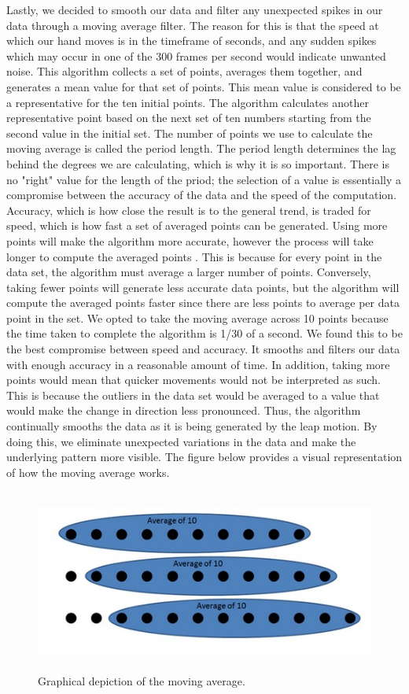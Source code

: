 \documentclass[letterpaper,english, 12pt]{article}
\begin{document}
Lastly, we decided to smooth our data and filter any unexpected spikes in our data through a moving average filter.  The reason for this is that the speed at which our hand moves is in the timeframe of seconds, and any sudden spikes which may occur in one of the 300 frames per second would indicate unwanted noise. This algorithm collects a set of points, averages them together, and generates a mean value for that set of points. This mean value is considered to be a representative for the ten initial points. The algorithm calculates another representative point based on the next set of ten numbers starting from the second value in the initial set. The number of points we use to calculate the moving average is called the period length. The period length determines the lag behind the degrees we are calculating, which is why it is so important. There is no "right" value for the length of the priod; the selection of a value is essentially a compromise between the accuracy of the data and the speed of the computation. Accuracy, which is how close the result is to the general trend, is traded for speed, which is how fast a set of averaged points can be generated. Using more points will make the algorithm more accurate, however the process will take longer to compute the averaged points \cite{cit13}. This is because for every point in the data set, the algorithm must average a larger number of points. Conversely, taking fewer points will generate less accurate data points, but the algorithm will compute the averaged points faster since there are less points to average per data point in the set. We opted to take the moving average across 10 points because the time taken to complete the algorithm is 1/30 of a second. We found this to be the best compromise between speed and accuracy. It smooths and filters our data with enough accuracy in a reasonable amount of time. In addition, taking more points would mean that quicker movements would not be interpreted as such. This is because the outliers in the data set would be averaged to a value that would make the change in direction less pronounced. Thus, the algorithm continually smooths the data as it is being generated by the leap motion. By doing this, we eliminate unexpected variations in the data and make the underlying pattern more visible. The figure below provides a visual representation of how the moving average works.  

\begin{figure}[H]
	\centering
	\includegraphics[height=6cm,width=120mm]{pics/movingAverage.jpg}
	\caption{Graphical depiction of the moving average.}
\end{figure}
\end{document}
